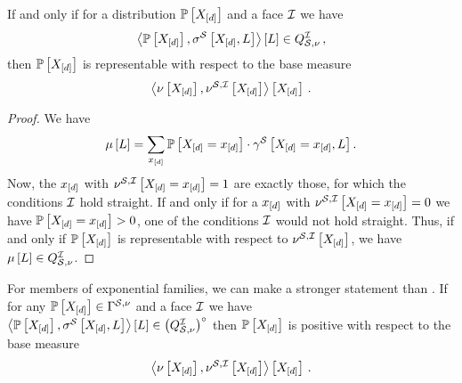 \begin{theorem}
    \label{the:facePolytopeCharacterization}
    If and only if for a distribution $\mathbb{P}\left[X_{[d]}\right]$ and a face $\mathcal{I}$ we have
    \begin{align*}
        \left\langle \mathbb{P}\left[X_{[d]}\right],\sigma^{\mathcal{S}}\left[X_{[d]},L\right]\right\rangle \left[ L \right]\in Q^{\mathcal{I}}_{\mathcal{S},\nu}\, ,
    \end{align*}
    then $\mathbb{P}\left[X_{[d]}\right]$ is representable with respect to the base measure
    \begin{align*}
        \left\langle \nu\left[X_{[d]}\right],\nu^{\mathcal{S},\mathcal{I}}\left[X_{[d]}\right]\right\rangle \left[ X_{[d]} \right] \, .
    \end{align*}
\end{theorem}
\begin{proof}
    We have
    \begin{align*}
        \mu\left[L\right] = \sum_{x_{[d]}} \mathbb{P}\left[X_{[d]}=x_{[d]}\right]\cdot\gamma^{\mathcal{S}}\left[X_{[d]}=x_{[d]},L\right] .
    \end{align*}
    Now, the $x_{[d]}$ with $\nu^{\mathcal{S},\mathcal{I}}\left[X_{[d]}=x_{[d]}\right]=1$ are exactly those, for which the conditions $\mathcal{I}$ hold straight.
    If and only if for a $x_{[d]}$ with $\nu^{\mathcal{S},\mathcal{I}}\left[X_{[d]}=x_{[d]}\right]=0$ we have $\mathbb{P}\left[X_{[d]}=x_{[d]}\right]>0$, one of the conditions $\mathcal{I}$ would not hold straight.
    Thus, if and only if $\mathbb{P}\left[X_{[d]}\right]$ is representable with respect to $\nu^{\mathcal{S},\mathcal{I}}\left[X_{[d]}\right]$, we have $\mu\left[L\right]\in Q^{\mathcal{I}}_{\mathcal{S},\nu}$.
\end{proof}

For members of exponential families, we can make a stronger statement than .
If for any $\mathbb{P}\left[X_{[d]}\right]\in\Gamma^{\mathcal{S},\nu}$ and a face $\mathcal{I}$ we have $\left\langle \mathbb{P}\left[X_{[d]}\right],\sigma^{\mathcal{S}}\left[X_{[d]},L\right]\right\rangle \left[ L \right]\in{\left(Q^{\mathcal{I}}_{\mathcal{S},\nu}\right)}^{\circ}$ then $\mathbb{P}\left[X_{[d]}\right]$ is positive with respect to the base measure
\begin{align*}
    \left\langle \nu\left[X_{[d]}\right],\nu^{\mathcal{S},\mathcal{I}}\left[X_{[d]}\right]\right\rangle \left[ X_{[d]} \right] \, .
\end{align*}

